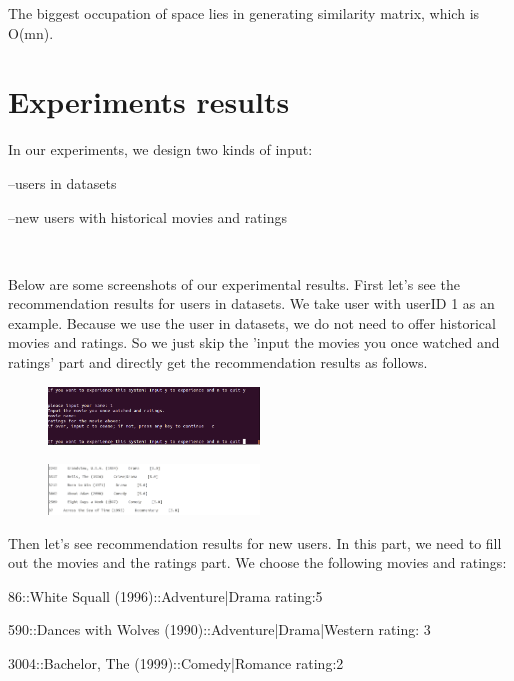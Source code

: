 \documentclass[two column]{article}
\begin{document}
\par The biggest occupation of space lies in generating similarity matrix, which is O(mn).


\section{Experiments results}
\par In our experiments, we design two kinds of input:
\par--users in datasets
\par--new users with historical movies and ratings
\par ~

\par Below are some screenshots of our experimental results. First let's see the recommendation results for users in datasets. We take user with userID 1 as an example. Because we use the user in datasets, we do not need to offer historical movies and ratings. So we just skip the 'input the movies you once watched and ratings' part and directly get the recommendation results as follows.

\begin{figure}[H]
\centering
\includegraphics[width=0.5\textwidth]{user-in-dataset.png}
\end{figure}

\begin{figure}[H]
\centering
\includegraphics[width=0.5\textwidth]{user-in-dataset1.png}
\end{figure}


\par Then let's see recommendation results for new users. In this part, we need to fill out the movies and the ratings part. We choose the following movies and ratings:
\par 86::White Squall (1996)::Adventure|Drama     rating:5
\par 590::Dances with Wolves (1990)::Adventure|Drama|Western     rating: 3
\par 3004::Bachelor, The (1999)::Comedy|Romance     rating:2
\par ~
\end{document}
